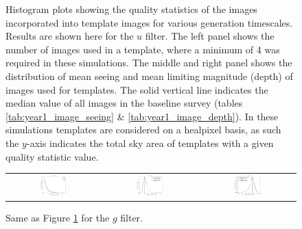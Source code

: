 \documentclass[preprintm,linenumbers]{aastex631}
\begin{document}
\begin{figure}[h]
\begin{tabular}{c c c}
			\end{tabular}
			\caption{
				Histogram plots showing the quality statistics of the images incorporated into template images for various generation timescales.
				Results are shown here for the $u$ filter. 
				The left panel shows the number of images used in a template, where a minimum of 4 was required in these simulations. %
				The middle and right panel shows the distribution of mean seeing and mean limiting magnitude (depth) of images used for templates.
				The solid vertical line indicates the median value of all images in the baseline survey (tables \ref{tab:year1_image_seeing} \& \ref{tab:year1_image_depth}).
				In these simulations templates are considered on a healpixel basis, as such the $y$-axis indicates the total sky area of templates with a given quality statistic value. \label{appendixa:1}
			}
		\end{figure}
		

  \begin{figure}[h]
			\centering
			\begin{tabular}{c c c}
				
				\includegraphics[width=0.3\textwidth]{results/histograms_templates_tscale/hist_first_year_one_snap_v4_0_10yrs_db_noDD_noTwi_doALLTemplateMetrics_reduceNTemplate_g_noDD_noTwi.pdf} &
				\includegraphics[width=0.3\textwidth]{results/histograms_templates_tscale/hist_first_year_one_snap_v4_0_10yrs_db_noDD_noTwi_doALLTemplateMetrics_reduceSeeingTemplate_g_noDD_noTwi.pdf} &
				\includegraphics[width=0.3\textwidth]{results/histograms_templates_tscale/hist_first_year_one_snap_v4_0_10yrs_db_noDD_noTwi_doALLTemplateMetrics_reduceDepthTemplate_g_noDD_noTwi.pdf} \\
				
			\end{tabular}
			\caption{
				Same as Figure \ref{appendixa:1} for the $g$ filter.  \label{appendixa:2}
			}
		\end{figure}
\end{document}
